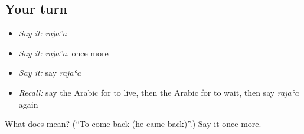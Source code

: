 \subsection*{Your turn}
\begin{itemize}
\raggedright
  \item \emph{Say it:} \emph{rajaʿa}
  \item \emph{Say it:} \emph{rajaʿa}, once more
  \item \emph{Say it:} say \emph{rajaʿa}
  \item \emph{Recall:} say the Arabic for to live, then the Arabic for to wait, then say \emph{rajaʿa} again
\end{itemize}

\begin{tcolorbox}[breakable,colback=teal!4,colframe=teal!35!black,title={Before you move on}]
What does  mean? (\textquotedblleft{}To come back (he came back)\textquotedblright{}.) Say it once more.
\end{tcolorbox}
